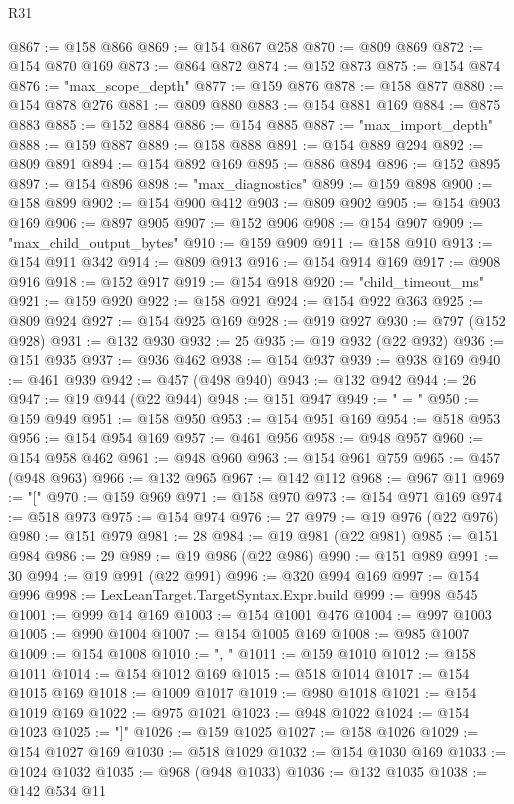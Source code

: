 \begin{lexlean}{R31}
\begin{coremodule}
@867 := @158 @866
@869 := @154 @867 @258
@870 := @809 @869
@872 := @154 @870 @169
@873 := @864 @872
@874 := @152 @873
@875 := @154 @874
@876 := "max_scope_depth"
@877 := @159 @876
@878 := @158 @877
@880 := @154 @878 @276
@881 := @809 @880
@883 := @154 @881 @169
@884 := @875 @883
@885 := @152 @884
@886 := @154 @885
@887 := "max_import_depth"
@888 := @159 @887
@889 := @158 @888
@891 := @154 @889 @294
@892 := @809 @891
@894 := @154 @892 @169
@895 := @886 @894
@896 := @152 @895
@897 := @154 @896
@898 := "max_diagnostics"
@899 := @159 @898
@900 := @158 @899
@902 := @154 @900 @412
@903 := @809 @902
@905 := @154 @903 @169
@906 := @897 @905
@907 := @152 @906
@908 := @154 @907
@909 := "max_child_output_bytes"
@910 := @159 @909
@911 := @158 @910
@913 := @154 @911 @342
@914 := @809 @913
@916 := @154 @914 @169
@917 := @908 @916
@918 := @152 @917
@919 := @154 @918
@920 := "child_timeout_ms"
@921 := @159 @920
@922 := @158 @921
@924 := @154 @922 @363
@925 := @809 @924
@927 := @154 @925 @169
@928 := @919 @927
@930 := @797 (@152 @928)
@931 := @132 @930
@932 := 25
@935 := @19 @932 (@22 @932)
@936 := @151 @935
@937 := @936 @462
@938 := @154 @937
@939 := @938 @169
@940 := @461 @939
@942 := @457 (@498 @940)
@943 := @132 @942
@944 := 26
@947 := @19 @944 (@22 @944)
@948 := @151 @947
@949 := " = "
@950 := @159 @949
@951 := @158 @950
@953 := @154 @951 @169
@954 := @518 @953
@956 := @154 @954 @169
@957 := @461 @956
@958 := @948 @957
@960 := @154 @958 @462
@961 := @948 @960
@963 := @154 @961 @759
@965 := @457 (@948 @963)
@966 := @132 @965
@967 := @142 @112
@968 := @967 @11
@969 := "["
@970 := @159 @969
@971 := @158 @970
@973 := @154 @971 @169
@974 := @518 @973
@975 := @154 @974
@976 := 27
@979 := @19 @976 (@22 @976)
@980 := @151 @979
@981 := 28
@984 := @19 @981 (@22 @981)
@985 := @151 @984
@986 := 29
@989 := @19 @986 (@22 @986)
@990 := @151 @989
@991 := 30
@994 := @19 @991 (@22 @991)
@996 := @320 @994 @169
@997 := @154 @996
@998 := LexLeanTarget.TargetSyntax.Expr.build
@999 := @998 @545
@1001 := @999 @14 @169
@1003 := @154 @1001 @476
@1004 := @997 @1003
@1005 := @990 @1004
@1007 := @154 @1005 @169
@1008 := @985 @1007
@1009 := @154 @1008
@1010 := ", "
@1011 := @159 @1010
@1012 := @158 @1011
@1014 := @154 @1012 @169
@1015 := @518 @1014
@1017 := @154 @1015 @169
@1018 := @1009 @1017
@1019 := @980 @1018
@1021 := @154 @1019 @169
@1022 := @975 @1021
@1023 := @948 @1022
@1024 := @154 @1023
@1025 := "]"
@1026 := @159 @1025
@1027 := @158 @1026
@1029 := @154 @1027 @169
@1030 := @518 @1029
@1032 := @154 @1030 @169
@1033 := @1024 @1032
@1035 := @968 (@948 @1033)
@1036 := @132 @1035
@1038 := @142 @534 @11

\end{coremodule}
\end{lexlean}
